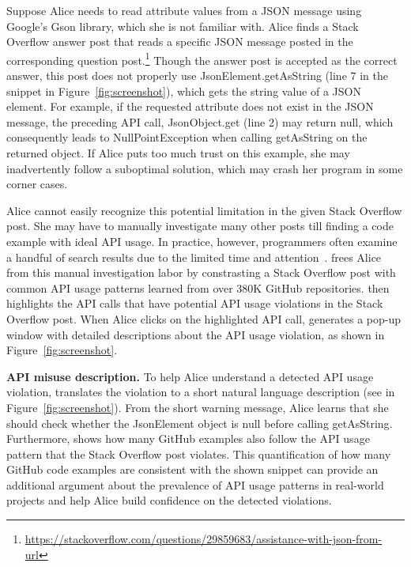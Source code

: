 Suppose Alice needs to read attribute values from a {\ttt JSON} message using Google's Gson library, which she is not familiar with. Alice finds a Stack Overflow answer post that reads a specific {\ttt JSON} message posted in the corresponding question post.\footnote{\url{https://stackoverflow.com/questions/29859683/assistance-with-json-from-url}} Though the answer post is accepted as the correct answer, this post does not properly use {\ttt JsonElement.getAsString} (line 7 in the snippet in Figure~\ref{fig:screenshot}), which gets the {\ttt string} value of a {\ttt JSON} element. For example, if the requested attribute does not exist in the {\ttt JSON} message, the preceding API call, {\ttt JsonObject.get} (line 2) may return {\ttt null}, which consequently leads to {\ttt NullPointException} when calling {\ttt getAsString} on the returned object. If Alice puts too much trust on this example, she may inadvertently follow a suboptimal solution, which may crash her program in some corner cases. 

Alice cannot easily recognize this potential limitation in the given Stack Overflow post. She may have to manually investigate many other posts till finding a code example with ideal API usage. In practice, however, programmers often examine a handful of search results due to the limited time and attention~\cite{brandt2009two, starke2009working, duala2012asking}. {\tool} frees Alice from this manual investigation labor by constrasting a Stack Overflow post with common API usage patterns learned from over 380K GitHub repositories. {\tool} then highlights the API calls that have potential API usage violations in the Stack Overflow post. When Alice clicks on the highlighted API call, {\tool} generates a pop-up window with detailed descriptions about the API usage violation, as shown in Figure~\ref{fig:screenshot}.

{\bf API misuse description.} To help Alice understand a detected API usage violation, {\tool} translates the violation to a short natural language description (see  in Figure~\ref{fig:screenshot}). From  the short warning message, Alice learns that she should check whether the {\ttt JsonElement} object is {\ttt null} before calling {\ttt getAsString}. Furthermore, {\tool} shows how many GitHub examples also follow the API usage pattern that the Stack Overflow post violates. This quantification of how many GitHub code examples are consistent with the shown snippet can provide an additional argument about the prevalence of API usage patterns in real-world projects and help Alice build confidence on the detected violations.

